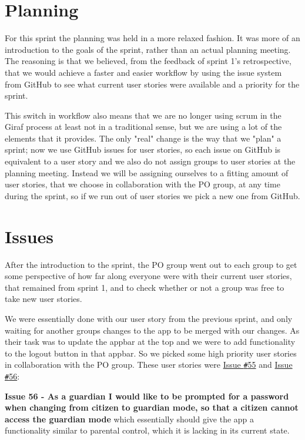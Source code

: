 \section{Planning}\label{sprint2Planning}
For this sprint the planning was held in a more relaxed fashion.
It was more of an introduction to the goals of the sprint, rather than an actual planning meeting.
The reasoning is that we believed, from the feedback of sprint 1's retrospective, that we would achieve a faster and easier workflow by using the issue system from GitHub to see what current user stories were available and a priority for the sprint.

This switch in workflow also means that we are no longer using scrum in the Giraf process at least not in a traditional sense, but we are using a lot of the elements that it provides.
The only "real" change is the way that we "plan" a sprint; now we use GitHub issues for user stories, so each issue on GitHub is equivalent to a user story and we also do not assign groups to user stories at the planning meeting.
Instead we will be assigning ourselves to a fitting amount of user stories, that we choose in collaboration with the PO group, at any time during the sprint, so if we run out of user stories we pick a new one from GitHub.

\section{Issues}\label{sprint2planstories}
After the introduction to the sprint, the PO group went out to each group to get some perspective of how far along everyone were with their current user stories, that remained from sprint 1, and to check whether or not a group was free to take new user stories.

We were essentially done with our user story from the previous sprint, and only waiting for another groups changes to the app to be merged with our changes.
As their task was to update the appbar at the top and we were to add functionality to the logout button in that appbar.
So we picked some high priority user stories in collaboration with the PO group.
These user stories were \href{https://github.com/aau-giraf/wiki/issues/55}{Issue \texttt{\#}55} and \href{https://github.com/aau-giraf/wiki/issues/56}{Issue \texttt{\#}56}:

\textbf{Issue 56 - As a guardian I would like to be prompted for a password when changing from citizen to guardian mode, so that a citizen cannot access the guardian mode} which essentially should give the app a functionality similar to parental control, which it is lacking in its current state.


